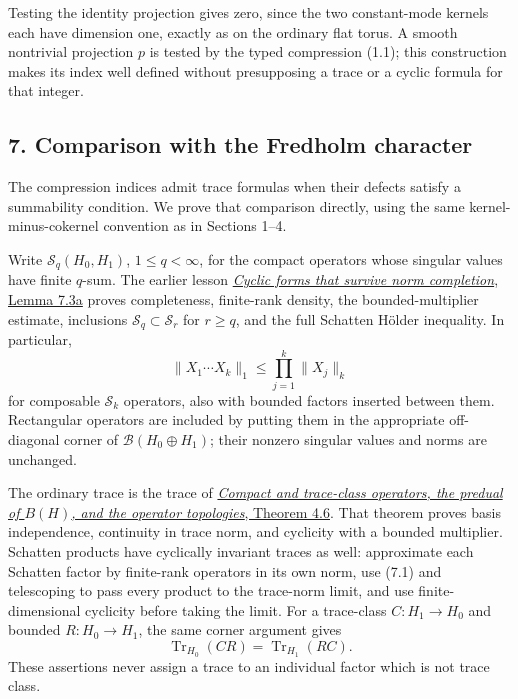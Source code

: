 \documentclass[
  11pt,
]{article}
\begin{document}
Testing the identity projection gives zero, since the two constant-mode
kernels each have dimension one, exactly as on the ordinary flat torus.
A smooth nontrivial projection \(p\) is tested by the typed compression
(1.1); this construction makes its index well defined without
presupposing a trace or a cyclic formula for that integer.

\subsection{7. Comparison with the Fredholm
character}\label{comparison-with-the-fredholm-character}

The compression indices admit trace formulas when their defects satisfy
a summability condition. We prove that comparison directly, using the
same kernel-minus-cokernel convention as in Sections 1--4.

Write \(\mathcal S_q(H_0,H_1)\), \(1\leq q<\infty\), for the compact
operators whose singular values have finite \(q\)-sum. The earlier
lesson
\href{../NCG-CYCLIC/public/reader/n-traces.html\#7-geometric-and-operator-examples}{\emph{Cyclic
forms that survive norm completion}, Lemma 7.3a} proves completeness,
finite-rank density, the bounded-multiplier estimate, inclusions
\(\mathcal S_q\subset\mathcal S_r\) for \(r\geq q\), and the full
Schatten Hölder inequality. In particular, \[
 \|X_1\cdots X_k\|_1\leq\prod_{j=1}^k\|X_j\|_k
 \tag{7.1}
\] for composable \(\mathcal S_k\) operators, also with bounded factors
inserted between them. Rectangular operators are included by putting
them in the appropriate off-diagonal corner of
\(\mathcal B(H_0\oplus H_1)\); their nonzero singular values and norms
are unchanged.

The ordinary trace is the trace of
\href{../foundations-of-von-neumann-algebras/compact-and-trace-class-operators-the-predual-of-b-h-and-the-operator-topologies.html\#OA-FND-LT-05}{\emph{Compact
and trace-class operators, the predual of \(B(H)\), and the operator
topologies}, Theorem 4.6}. That theorem proves basis independence,
continuity in trace norm, and cyclicity with a bounded multiplier.
Schatten products have cyclically invariant traces as well: approximate
each Schatten factor by finite-rank operators in its own norm, use (7.1)
and telescoping to pass every product to the trace-norm limit, and use
finite-dimensional cyclicity before taking the limit. For a trace-class
\(C:H_1\to H_0\) and bounded \(R:H_0\to H_1\), the same corner argument
gives \[
 \operatorname{Tr}_{H_0}(CR)=\operatorname{Tr}_{H_1}(RC).
 \tag{7.2}
\] These assertions never assign a trace to an individual factor which
is not trace class.
\end{document}
